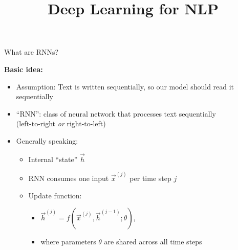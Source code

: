 \documentclass[11pt,compress,t,notes=noshow, xcolor=table]{beamer}
\title{Deep Learning for NLP}
\begin{document}


\begin{vbframe}{What are RNNs?}

\vfill

\textbf{Basic idea:}

\begin{itemize}
	\item Assumption: Text is written sequentially, so our model should read it sequentially
	\item ``RNN'': class of neural network that processes text sequentially\\
				(left-to-right \textit{or} right-to-left)
	\item Generally speaking:
		\begin{itemize}
			\item Internal ``state'' $\vec h$
			\item RNN consumes one input $\vec x^{(j)}$ per time step $j$
			\item Update function:
			\begin{itemize}
				\item $\vec h^{(j)} = f(\vec x^{(j)}, \vec h^{({j-1})}; \theta)$,
				\item where parameters $\theta$ are shared across all time steps
			\end{itemize}
		\end{itemize}
\end{itemize}

\vfill

\end{vbframe}

\end{document}
